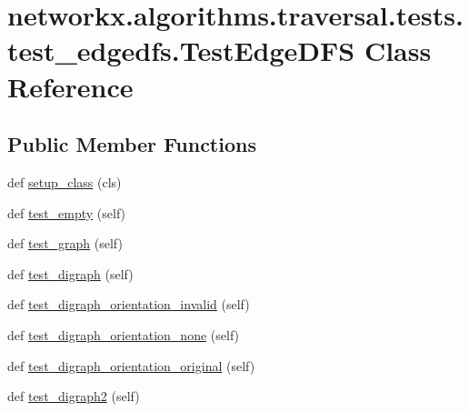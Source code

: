 \hypertarget{classnetworkx_1_1algorithms_1_1traversal_1_1tests_1_1test__edgedfs_1_1TestEdgeDFS}{}\section{networkx.\+algorithms.\+traversal.\+tests.\+test\+\_\+edgedfs.\+Test\+Edge\+D\+FS Class Reference}
\label{classnetworkx_1_1algorithms_1_1traversal_1_1tests_1_1test__edgedfs_1_1TestEdgeDFS}
\subsection*{Public Member Functions}
\begin{DoxyCompactItemize}
\item 
def \hyperlink{classnetworkx_1_1algorithms_1_1traversal_1_1tests_1_1test__edgedfs_1_1TestEdgeDFS_a016df95aaf57561f9a43b1e5c6b026e1}{setup\+\_\+class} (cls)
\item 
def \hyperlink{classnetworkx_1_1algorithms_1_1traversal_1_1tests_1_1test__edgedfs_1_1TestEdgeDFS_abccf791f44e50a71cc159426de8ab8a0}{test\+\_\+empty} (self)
\item 
def \hyperlink{classnetworkx_1_1algorithms_1_1traversal_1_1tests_1_1test__edgedfs_1_1TestEdgeDFS_a73d8f01e257cc71442eef811a9316912}{test\+\_\+graph} (self)
\item 
def \hyperlink{classnetworkx_1_1algorithms_1_1traversal_1_1tests_1_1test__edgedfs_1_1TestEdgeDFS_a937360c7a84b21d5c277bf18dd74045a}{test\+\_\+digraph} (self)
\item 
def \hyperlink{classnetworkx_1_1algorithms_1_1traversal_1_1tests_1_1test__edgedfs_1_1TestEdgeDFS_a349eab7e21d4c189d977144f639e46c5}{test\+\_\+digraph\+\_\+orientation\+\_\+invalid} (self)
\item 
def \hyperlink{classnetworkx_1_1algorithms_1_1traversal_1_1tests_1_1test__edgedfs_1_1TestEdgeDFS_a0c32937ca0570da04a3fdb18958c8940}{test\+\_\+digraph\+\_\+orientation\+\_\+none} (self)
\item 
def \hyperlink{classnetworkx_1_1algorithms_1_1traversal_1_1tests_1_1test__edgedfs_1_1TestEdgeDFS_a5fa9c65e29ef40a5df81772ffb061b6e}{test\+\_\+digraph\+\_\+orientation\+\_\+original} (self)
\item 
def \hyperlink{classnetworkx_1_1algorithms_1_1traversal_1_1tests_1_1test__edgedfs_1_1TestEdgeDFS_a706dd2671f83a35b8969f6195176fe48}{test\+\_\+digraph2} (self)

\end{DoxyCompactItemize}
